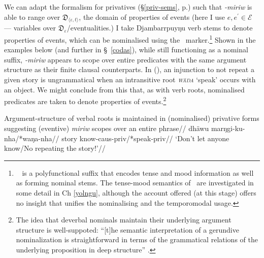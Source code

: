 We can adapt the formalism for privatives (\S\ref{priv-sems}, p.\pageref{priv-sems}) such that \textit{-miriw} is able to range over $\mathfrak D_{\langle\varepsilon,t\rangle}$, the domain of properties of events (here I use $e,e^\prime\in\mathcal E$ --- variables over $ \mathfrak D_\varepsilon $/eventualities.) I take Djambarrpuyŋu verb stems to denote properties of events, which can be nominalised using the \IV~marker.\footnote{\IV~ is a polyfunctional suffix that encodes tense and mood information as well as forming nominal stems. The tense-mood semantics of \IV~are investigated in some detail in Ch \ref{yolngu}, although the account offered (at this stage) offers no insight that unifies the nominalising and the temporomodal usage.} Shown in the examples below (and further in \S~\ref{codas}), while still functioning as a nominal suffix, \textit{-miriw} appears to scope over entire predicates with the same argument structure as their finite clausal counterparts. In (), an injunction to not repeat a given story is ungrammatical when an intransitive root \textit{\textsc{wäŋa}} `speak' occurs with an object. We might conclude from this that, as with verb roots, nominalised predicates are taken to denote properties of events.\footnote{The idea that deverbal nominals maintain their underlying argument structure is well-suppoted: ``[t]he semantic interpretation of a gerundive nominalization is straightforward in terms of the grammatical relations of the underlying proposition in deep structure'' \citep[187]{Chomsky1970}.} 

\pex\begingl\glpreamble Argument-structure of verbal roots is maintained in (nominalised) privative forms suggesting (eventive) \textdblhyphen\textit{miriw} scopes over an entire phrase//
\gla dhäwu marŋgi-ku-nha/*waŋa-nha//
\glb story know-\gls{caus}-\IV\textdblhyphen\gls{priv}/*speak-\IV\textdblhyphen\gls{priv}//
\glft`Don't let anyone know/No repeating the story!'\trailingcitation{[AW~20190502]}//\endgl
\xe


